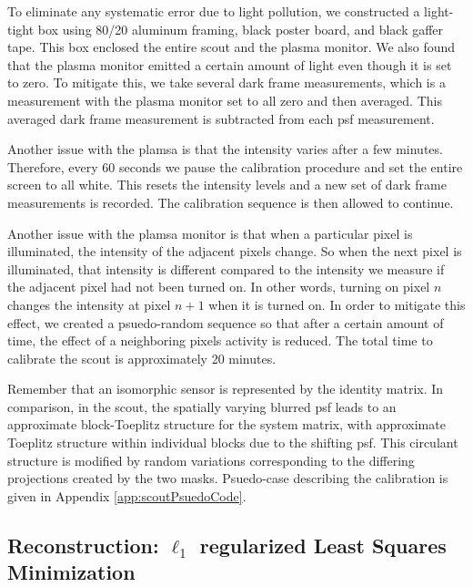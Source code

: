To eliminate any systematic error due to light pollution, we constructed a light-tight box using 80/20 aluminum framing, black poster board, and black gaffer tape. This box enclosed the entire \gls{scout} and the plasma monitor. We also found that the plasma monitor emitted a certain amount of light even though it is set to zero. To mitigate this, we take several dark frame measurements, which is a measurement with the plasma monitor set to all zero and then averaged. This averaged dark frame measurement is subtracted from each \gls{psf} measurement. 

Another issue with the plamsa is that the intensity varies after a few minutes. Therefore, every 60 seconds we pause the calibration procedure and set the entire screen to all white. This resets the intensity levels and a new set of dark frame measurements is recorded. The calibration sequence is then allowed to continue. 

Another issue with the plamsa monitor is that when a particular pixel is illuminated, the intensity of the adjacent pixels change. So when the next pixel is illuminated, that intensity is different compared to the intensity we measure if the adjacent pixel had not been turned on. In other words, turning on pixel $n$ changes the intensity at pixel $n+1$ when it is turned on. In order to mitigate this effect, we created a psuedo-random sequence so that after a certain amount of time, the effect of a neighboring pixels activity is reduced. The total time to calibrate the \gls{scout} is approximately 20 minutes. 

Remember that an isomorphic sensor is represented by the identity matrix. In comparison, in the \gls{scout}, the spatially varying blurred \gls{psf} leads to an approximate block-Toeplitz structure for the system matrix, with approximate Toeplitz structure within individual blocks due to the shifting \gls{psf}. This circulant structure is modified by random variations corresponding to the differing projections created by the two masks. Psuedo-case describing the calibration is given in Appendix \ref{app:scoutPsuedoCode}.  




\subsection{Reconstruction: $\ell_1$ regularized Least Squares Minimization}

